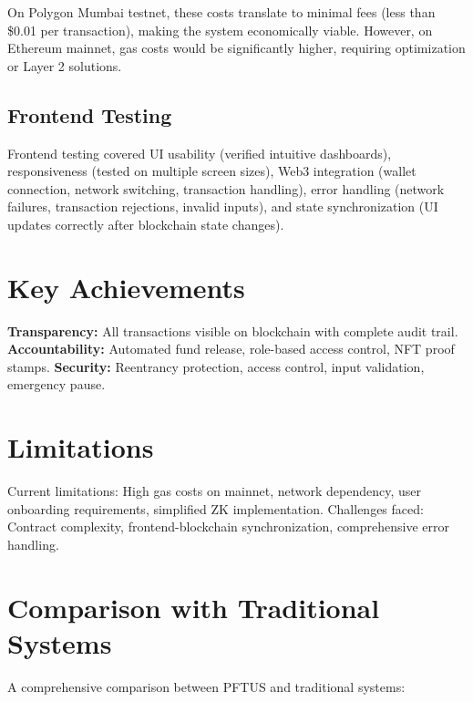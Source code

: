 \documentclass[12pt,a4wide]{report}
\theoremstyle{plain}
\theoremstyle{definition}
\theoremstyle{remark}
\begin{document}
On Polygon Mumbai testnet, these costs translate to minimal fees (less than \$0.01 per transaction), making the system economically viable. However, on Ethereum mainnet, gas costs would be significantly higher, requiring optimization or Layer 2 solutions.

\subsection{Frontend Testing}

Frontend testing covered UI usability (verified intuitive dashboards), responsiveness (tested on multiple screen sizes), Web3 integration (wallet connection, network switching, transaction handling), error handling (network failures, transaction rejections, invalid inputs), and state synchronization (UI updates correctly after blockchain state changes).

\section{Key Achievements}

\textbf{Transparency:} All transactions visible on blockchain with complete audit trail. \textbf{Accountability:} Automated fund release, role-based access control, NFT proof stamps. \textbf{Security:} Reentrancy protection, access control, input validation, emergency pause.

\section{Limitations}

Current limitations: High gas costs on mainnet, network dependency, user onboarding requirements, simplified ZK implementation. Challenges faced: Contract complexity, frontend-blockchain synchronization, comprehensive error handling.

\section{Comparison with Traditional Systems}

A comprehensive comparison between PFTUS and traditional systems:
\end{document}
